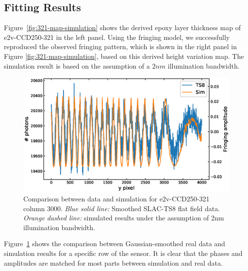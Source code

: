 \documentclass[twocolumn]{aastex63} %
\begin{document}
\begin{CJK*}{UTF8}{gbsn}
\subsection{Fitting Results}
Figure~\ref{fig:321-map-simulation} shows the derived epoxy layer thickness map of e2v-CCD250-321 in the left panel. Using the fringing model, we successfully reproduced the observed fringing pattern, which is shown in the right panel in Figure \ref{fig:321-map-simulation}, based on this derived height variation map. The simulation result is based on the assumption of a $2nm$ illumination bandwidth.
\begin{figure}[hbt]
\centering
\includegraphics[scale = 0.4]{E2V-321-detail-compare.eps}
\caption{Comparison between data and simulation for e2v-CCD250-321 column 3000. {\it Blue solid line:} Smoothed SLAC-TS8 flat field data. {\it Orange dashed line:} simulated results under the assumption of 2nm illumination bandwidth.}
\label{fig:321-detail-compare}
\end{figure}
Figure~\ref{fig:321-detail-compare} shows the comparison between Gaussian-smoothed real data and simulation results for a specific row of the sensor. It is clear that the phases and amplitudes are matched for most parts between simulation and real data.



\end{CJK*}
\end{document}
